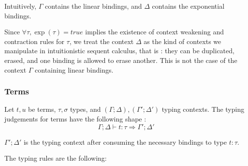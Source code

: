 \documentclass{article}
\begin{document}
Intuitively, $\Gamma$ contains the linear bindings, and $\Delta$ contains the exponential bindings.\vspace{\baselineskip}

Since $\forall \tau, \operatorname{exp}(\tau) = true$ implies the existence of context weakening and contraction rules for $\tau$, we treat the context $\Delta$ as the kind of contexts we manipulate in intuitionistic sequent calculus, that is : they can be duplicated, erased, and one binding is allowed to erase another. This is not the case of the context $\Gamma$ containing linear bindings.

\subsubsection{Terms}

Let $t, u$ be terms, $\tau, \sigma$ types, and $(\Gamma; \Delta), (\Gamma'; \Delta')$ typing contexts. The typing judgements for terms have the following shape :
$$
\Gamma; \Delta \vdash t : \tau \Rightarrow \Gamma'; \Delta'
$$

$\Gamma'; \Delta'$ is the typing context after consuming the necessary bindings to type $t : \tau$. \vspace{\baselineskip}

The typing rules are the following:
\end{document}
